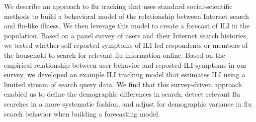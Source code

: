 \documentclass[fleqn,10pt]{wlscirep}
\begin{document}
We describe an approach to flu tracking that uses standard social-scientific methods to build a behavioral model of the relationship between Internet search and flu-like illness. We then leverage this model to create a forecast of ILI in the population. Based on a panel survey of users and their Internet search histories, we tested whether self-reported symptoms of ILI led respondents or members of the household to search for relevant flu information online. Based on the empirical relationship between user behavior and reported ILI symptoms in our survey, we developed an example ILI tracking model that estimates ILI using a limited stream of search query data. We find that this survey-driven approach enabled us to define the demographic differences in search, detect relevant flu searches in a more systematic fashion, and adjust for demographic variance in flu search behavior when building a forecasting model. 



\end{document}
